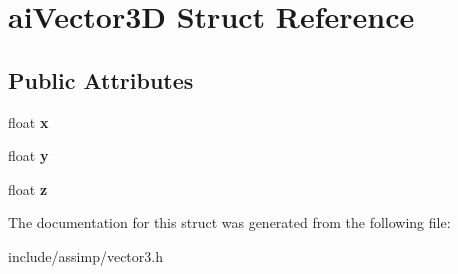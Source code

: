 \hypertarget{structaiVector3D}{\section{ai\-Vector3\-D \-Struct \-Reference}
\label{structaiVector3D}
}
\subsection*{\-Public \-Attributes}
\begin{DoxyCompactItemize}
\item 
\hypertarget{structaiVector3D_a3762d39eeb99def9ebd413b2bb8dd470}{float {\bfseries x}}\label{structaiVector3D_a3762d39eeb99def9ebd413b2bb8dd470}

\item 
\hypertarget{structaiVector3D_ac7b5fcc03324f8c3bc8429c95882dfb8}{float {\bfseries y}}\label{structaiVector3D_ac7b5fcc03324f8c3bc8429c95882dfb8}

\item 
\hypertarget{structaiVector3D_a2b93b892064995e8d24f4e3352175aae}{float {\bfseries z}}\label{structaiVector3D_a2b93b892064995e8d24f4e3352175aae}

\end{DoxyCompactItemize}


\-The documentation for this struct was generated from the following file\-:\begin{DoxyCompactItemize}
\item 
include/assimp/vector3.\-h\end{DoxyCompactItemize}
